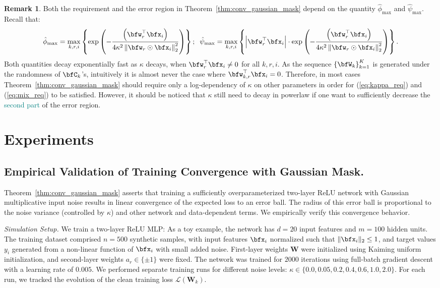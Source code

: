 \documentclass[10pt]{article} %
\theoremstyle{definition}
\newtheorem{remark}[theorem]{Remark}
\theoremstyle{plain}
\newcommand{\paren}[1]{\left(#1\right)}
\newcommand{\norm}[1]{\left\|#1\right\|}
\begin{document}
\begin{remark}
Both the requirement and the error region in Theorem~\ref{thm:conv_gaussian_mask} depend on the quantity $\hat{\phi}_{\max}$ and $\hat{\psi}_{\max}$. 
Recall that:
\begin{align*}
    \hat{\phi}_{\max}= \max_{k,r,i} \left\{\exp\paren{-\frac{\paren{\bfw_r^\top\bfx_i}}{4\kappa^2\norm{\bfw_r\odot\bfx_i}_2^2}}\right\}; \;\;\hat{\psi}_{\max}= \max_{k,r,i} \left\{\left|\bfw_r^\top\bfx_i\right| \cdot \exp\paren{-\frac{\paren{\bfw_r^\top\bfx_i}}{4\kappa^2\norm{\bfw_r\odot\bfx_i}_2^2}}\right\}.
\end{align*}
Both quantities decay exponentially fast as $\kappa$ decays, when $\bfw_r^\top\bfx_i \neq 0$ for all $k,r,i$. 
As the sequence $\left\{\bfW_k\right\}_{k=1}^K$ is generated under the randomness of $\bfC_k$'s, intuitively it is almost never the case where $\bfw_{k,r}^\top\bfx_i = 0$. Therefore, in most cases Theorem~\ref{thm:conv_gaussian_mask} should require only a log-dependency of $\kappa$ on other parameters in order for (\ref{eq:kappa_req}) and (\ref{eq:mix_req}) to be satisfied. However, it should be noticed that $\kappa$ still need to decay in powerlaw if one want to sufficiently decrease the \textcolor{teal}{second part} of the error region. 
\end{remark}

\section{Experiments}
\subsection{Empirical Validation of Training Convergence with Gaussian Mask.}
Theorem~\ref{thm:conv_gaussian_mask} asserts that training a sufficiently overparameterized two-layer ReLU network with Gaussian multiplicative input noise results in linear convergence of the expected loss to an error ball. The radius of this error ball is proportional to the noise variance (controlled by $\kappa$) and other network and data-dependent terms. We empirically verify this convergence behavior.

\textit{Simulation Setup.} 
We train a two-layer ReLU MLP: As a toy example, the network has $d=20$ input features and $m=100$ hidden units. 
The training dataset comprised $n=500$ synthetic samples, with input features $\bfx_i$ normalized such that $\|\bfx_i\|_2 \le 1$, and target values $y_i$ generated from a non-linear function of $\bfx_i$ with small added noise. 
First-layer weights $\mathbf{W}$ were initialized using Kaiming uniform initialization, and second-layer weights $a_r \in \{\pm 1\}$ were fixed. 
The network was trained for $2000$ iterations using full-batch gradient descent with a learning rate of $0.005$. 
We performed separate training runs for different noise levels: $\kappa \in \{0.0, 0.05, 0.2, 0.4, 0.6, 1.0, 2.0\}$. For each run, we tracked the evolution of the clean training loss $\mathcal{L}(\mathbf{W}_k)$.
\end{document}
